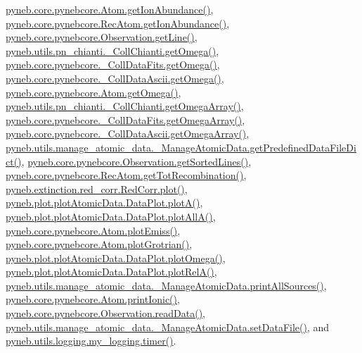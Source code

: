 \hyperlink{pynebcore_8py_source_l02110}{pyneb.\+core.\+pynebcore.\+Atom.\+get\+Ion\+Abundance()}, \hyperlink{pynebcore_8py_source_l02961}{pyneb.\+core.\+pynebcore.\+Rec\+Atom.\+get\+Ion\+Abundance()}, \hyperlink{pynebcore_8py_source_l03543}{pyneb.\+core.\+pynebcore.\+Observation.\+get\+Line()}, \hyperlink{pn__chianti_8py_source_l00484}{pyneb.\+utils.\+pn\+\_\+chianti.\+\_\+\+Coll\+Chianti.\+get\+Omega()}, \hyperlink{pynebcore_8py_source_l00811}{pyneb.\+core.\+pynebcore.\+\_\+\+Coll\+Data\+Fits.\+get\+Omega()}, \hyperlink{pynebcore_8py_source_l01063}{pyneb.\+core.\+pynebcore.\+\_\+\+Coll\+Data\+Ascii.\+get\+Omega()}, \hyperlink{pynebcore_8py_source_l01262}{pyneb.\+core.\+pynebcore.\+Atom.\+get\+Omega()}, \hyperlink{pn__chianti_8py_source_l00461}{pyneb.\+utils.\+pn\+\_\+chianti.\+\_\+\+Coll\+Chianti.\+get\+Omega\+Array()}, \hyperlink{pynebcore_8py_source_l00783}{pyneb.\+core.\+pynebcore.\+\_\+\+Coll\+Data\+Fits.\+get\+Omega\+Array()}, \hyperlink{pynebcore_8py_source_l01039}{pyneb.\+core.\+pynebcore.\+\_\+\+Coll\+Data\+Ascii.\+get\+Omega\+Array()}, \hyperlink{manage__atomic__data_8py_source_l00034}{pyneb.\+utils.\+manage\+\_\+atomic\+\_\+data.\+\_\+\+Manage\+Atomic\+Data.\+get\+Predefined\+Data\+File\+Dict()}, \hyperlink{pynebcore_8py_source_l03562}{pyneb.\+core.\+pynebcore.\+Observation.\+get\+Sorted\+Lines()}, \hyperlink{pynebcore_8py_source_l02735}{pyneb.\+core.\+pynebcore.\+Rec\+Atom.\+get\+Tot\+Recombination()}, \hyperlink{red__corr_8py_source_l00303}{pyneb.\+extinction.\+red\+\_\+corr.\+Red\+Corr.\+plot()}, \hyperlink{plot_atomic_data_8py_source_l00116}{pyneb.\+plot.\+plot\+Atomic\+Data.\+Data\+Plot.\+plot\+A()}, \hyperlink{plot_atomic_data_8py_source_l00188}{pyneb.\+plot.\+plot\+Atomic\+Data.\+Data\+Plot.\+plot\+All\+A()}, \hyperlink{pynebcore_8py_source_l02313}{pyneb.\+core.\+pynebcore.\+Atom.\+plot\+Emiss()}, \hyperlink{pynebcore_8py_source_l02372}{pyneb.\+core.\+pynebcore.\+Atom.\+plot\+Grotrian()}, \hyperlink{plot_atomic_data_8py_source_l00372}{pyneb.\+plot.\+plot\+Atomic\+Data.\+Data\+Plot.\+plot\+Omega()}, \hyperlink{plot_atomic_data_8py_source_l00261}{pyneb.\+plot.\+plot\+Atomic\+Data.\+Data\+Plot.\+plot\+Rel\+A()}, \hyperlink{manage__atomic__data_8py_source_l00431}{pyneb.\+utils.\+manage\+\_\+atomic\+\_\+data.\+\_\+\+Manage\+Atomic\+Data.\+print\+All\+Sources()}, \hyperlink{pynebcore_8py_source_l02167}{pyneb.\+core.\+pynebcore.\+Atom.\+print\+Ionic()}, \hyperlink{pynebcore_8py_source_l03589}{pyneb.\+core.\+pynebcore.\+Observation.\+read\+Data()}, \hyperlink{manage__atomic__data_8py_source_l00380}{pyneb.\+utils.\+manage\+\_\+atomic\+\_\+data.\+\_\+\+Manage\+Atomic\+Data.\+set\+Data\+File()}, and \hyperlink{logging_8py_source_l00115}{pyneb.\+utils.\+logging.\+my\+\_\+logging.\+timer()}.

